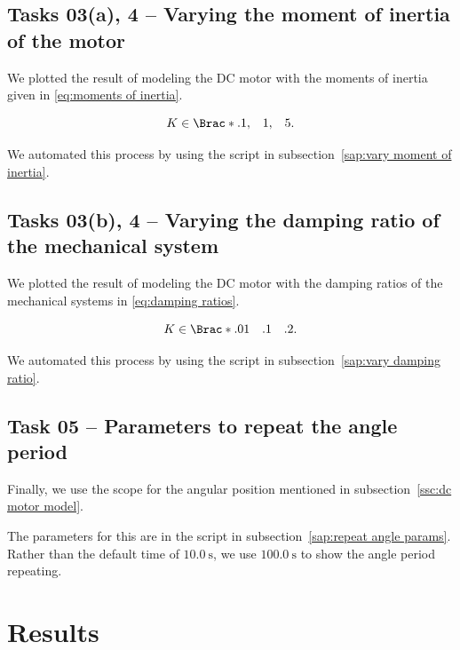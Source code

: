 \documentclass[12pt]{article}
\DeclarePairedDelimiter\Brac\{\}%
\begin{document}
\subsection{Tasks 03(a), 4 -- Varying the moment of inertia of the motor}

We plotted the result of modeling the DC motor with the moments of inertia given in \eqref{eq:moments of inertia}.

\begin{equation}\label{eq:moments of inertia}
    K \in \Brac*{\begin{matrix}.1, & 1, & 5\end{matrix}}.
\end{equation}

We automated this process by using the script in  subsection~\ref{sap:vary moment of inertia}.

\subsection{Tasks 03(b), 4 -- Varying the damping ratio of the mechanical system}

We plotted the result of modeling the DC motor with the damping ratios of the mechanical systems in \eqref{eq:damping ratios}.

\begin{equation}\label{eq:damping ratios}
    K \in \Brac*{\begin{matrix}.01 & .1 & .2\end{matrix}}.
\end{equation}

We automated this process by using the script in  subsection~\ref{sap:vary damping ratio}.


\subsection{Task 05 -- Parameters to repeat the angle period}

Finally, we use the scope for the angular position mentioned in subsection~\ref{ssc:dc motor model}.

The parameters for this are in the script in  subsection~\ref{sap:repeat angle params}. 
Rather than the default time of $\SI{10.0}\second$,
we use $\SI{100.0}\second$
to show the angle period repeating.

\section{Results}
\end{document}
